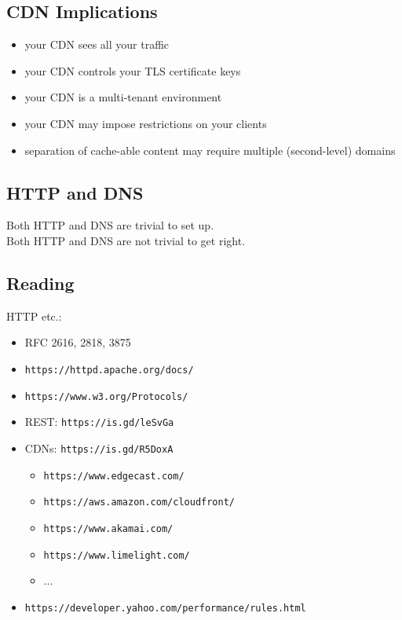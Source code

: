 \documentclass[xga]{xdvislides}
\begin{document}
\subsection{CDN Implications}
\begin{itemize}
	\item your CDN sees all your traffic
	\item your CDN controls your TLS certificate keys
	\item your CDN is a multi-tenant environment
	\item your CDN may impose restrictions on your clients
	\item separation of cache-able content may
		require multiple (second-level) domains
\end{itemize}

\subsection{HTTP and DNS}
\vspace*{\fill}
\Huge
Both HTTP and DNS are trivial to set up. \\

Both HTTP and DNS are not trivial to get right. \\
\Normalsize
\vspace*{\fill}

\subsection{Reading}
HTTP etc.:
\begin{itemize}
	\item RFC 2616, 2818, 3875
	\item \verb+https://httpd.apache.org/docs/+
	\item \verb+https://www.w3.org/Protocols/+
	\item REST: \verb+https://is.gd/leSvGa+
	\item CDNs: \verb+https://is.gd/R5DoxA+
		\begin{itemize}
			\item \verb+https://www.edgecast.com/+
			\item \verb+https://aws.amazon.com/cloudfront/+
			\item \verb+https://www.akamai.com/+
			\item \verb+https://www.limelight.com/+
			\item ...
		\end{itemize}
	\item \verb+https://developer.yahoo.com/performance/rules.html+
\end{itemize}
\end{document}
